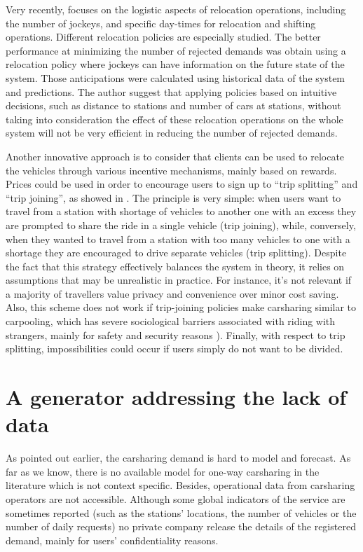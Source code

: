 \begin{bibunit}[ieeetr]
\medskip
Very recently, \cite{zakaria_optimization_2015} focuses on the logistic aspects of relocation operations, including the number of jockeys, and specific day-times for relocation and shifting operations.
Different relocation policies are especially studied.
The better performance at minimizing the number of rejected demands was obtain using a relocation policy where jockeys can have information on the future state of the system.
Those anticipations were calculated using historical data of the system and predictions. %
The author suggest that applying policies based on intuitive decisions, such as distance to stations and number of cars at stations, without taking into consideration the effect of these relocation operations on the whole system will not be very efficient in reducing the number of rejected demands.

\medskip
Another innovative approach is to consider that clients can be used to relocate the vehicles through various incentive mechanisms, mainly based on rewards.
Prices could be used in order to encourage users to sign up to ``trip splitting'' and ``trip joining'', as showed in \cite{barth_user_based_2004}.
The principle is very simple: when users want to travel from a station with shortage of vehicles to another one with an excess they are prompted to share the ride in a single vehicle (trip joining), while, conversely, when they wanted to travel from a station with too many vehicles to one with a shortage they are encouraged to drive separate vehicles (trip splitting).
Despite the fact that this strategy effectively balances the system in theory, it relies on assumptions that may be unrealistic in practice.
For instance, it's not relevant if a majority of travellers value privacy and convenience over minor cost saving.
Also, this scheme does not work if trip-joining policies make carsharing similar to carpooling, which has severe sociological barriers associated with riding with strangers, mainly for safety and security reasons \cite{chan_ridesharing_2012, correia_carpooling_2011}).
Finally, with respect to trip splitting, impossibilities could occur if users simply do not want to be divided.


\section{A generator addressing the lack of data} \label{csgeneratorDescription}

As pointed out earlier, the carsharing demand is hard to model and forecast.
As far as we know, there is no available model for one-way carsharing in the literature which is not context specific.
Besides, operational data from carsharing operators are not accessible.
Although some global indicators of the service are sometimes reported (such as the stations' locations, the number of vehicles or the number of daily requests) no private company release the details of the registered demand, mainly for users' confidentiality reasons.


\end{bibunit}
